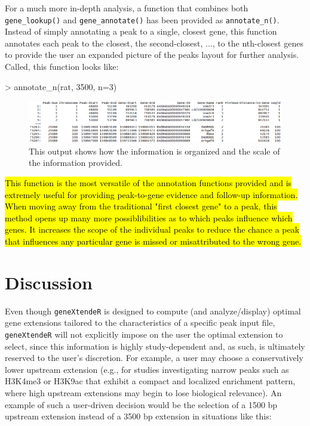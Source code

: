 \documentclass[12pt]{article}
\begin{document}
For a much more in-depth analysis, a function that combines both \texttt{gene\_lookup()} and \texttt{gene\_annotate()} has been provided as \texttt{annotate\_n()}. Instead of simply annotating a peak to a single, closest gene, this function annotates each peak to the closest, the second-closest, ..., to the nth-closest genes to provide the user an expanded picture of the peaks layout for further analysis. Called, this function looks like:

\begin{Schunk}
\begin{Sinput}
> annotate_n(rat, 3500, n=3)
\end{Sinput}
\end{Schunk}

\begin{figure}[H]
\centering
\includegraphics{figures/vignette_annotate_3500_3.png}
\caption{This output shows how the information is organized and the scale of the information provided.}
\end{figure}

\hl{This function is the most versatile of the annotation functions provided and is extremely useful for providing peak-to-gene evidence and follow-up information. When moving away from the traditional "first closest gene" to a peak, this method opens up many more possiblibilities as to which peaks influence which genes. It increases the scope of the individual peaks to reduce the chance a peak that influences any particular gene is missed or misattributed to the wrong gene.}

\section*{Discussion}

Even though \texttt{geneXtendeR} is designed to compute (and analyze/display) optimal gene extensions tailored to the characteristics of a specific peak input file, \texttt{geneXtendeR} will not explicitly impose on the user the optimal extension to select, since this information is highly study-dependent and, as such, is ultimately reserved to the user's discretion.  For example, a user may choose a conservatively lower upstream extension (e.g., for studies investigating narrow peaks such as H3K4me3 or H3K9ac that exhibit a compact and localized enrichment pattern, where high upstream extensions may begin to lose biological relevance).  An example of such a user-driven decision would be the selection of a 1500 bp upstream extension instead of a 3500 bp extension in situations like this:
\end{document}
